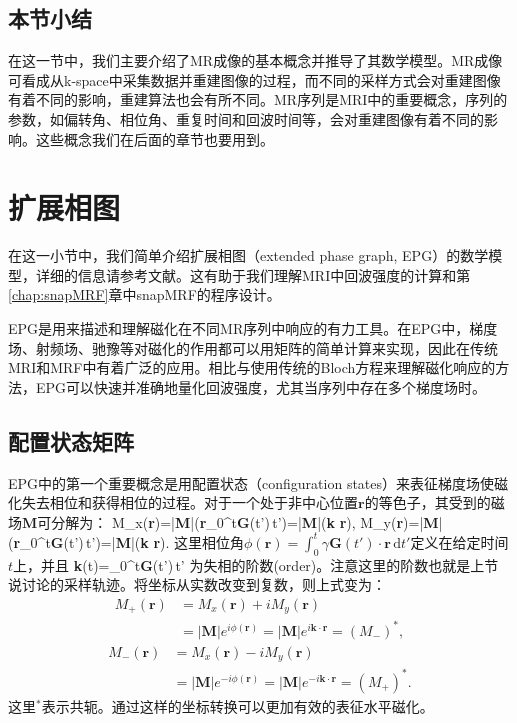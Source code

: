 \subsection{本节小结}
在这一节中，我们主要介绍了MR成像的基本概念并推导了其数学模型。MR成像可看成从k-space中采集数据并重建图像的过程，而不同的采样方式会对重建图像有着不同的影响，重建算法也会有所不同。MR序列是MRI中的重要概念，序列的参数，如偏转角、相位角、重复时间和回波时间等，会对重建图像有着不同的影响。这些概念我们在后面的章节也要用到。

\section{扩展相图}
\label{sec:epg}
在这一小节中，我们简单介绍扩展相图（extended phase graph, EPG）的数学模型，详细的信息请参考文献\cite{weigel}。这有助于我们理解MRI中回波强度的计算和第\ref{chap:snapMRF}章中snapMRF的程序设计。

EPG是用来描述和理解磁化在不同MR序列中响应的有力工具。在EPG中，梯度场、射频场、驰豫等对磁化的作用都可以用矩阵的简单计算来实现，因此在传统MRI和MRF中有着广泛的应用。相比与使用传统的Bloch方程来理解磁化响应的方法，EPG可以快速并准确地量化回波强度，尤其当序列中存在多个梯度场时。

\subsection{配置状态矩阵}
EPG中的第一个重要概念是用配置状态（configuration states）来表征梯度场使磁化失去相位和获得相位的过程。对于一个处于非中心位置$\textbf{r}$的等色子，其受到的磁场$\textbf{M}$可分解为：
 \beq M_x(\textbf{r})=|\textbf{M}|\cos\left(\gamma\textbf{r}\cdot\int_0^t\textbf{G}(t')\,t'\right)=|\textbf{M}|\cos(\textbf{k} \cdot \textbf{r}),\eeq
 \beq M_y(\textbf{r})=|\textbf{M}|\sin\left(\gamma\textbf{r}\cdot\int_0^t\textbf{G}(t')\,t'\right)=|\textbf{M}|\sin(\textbf{k} \cdot \textbf{r}).\eeq
这里相位角$\phi(\textbf{r})=\int_0^t\gamma\textbf{G}(t')\cdot\textbf{r}\,\mathrm{d}t'$定义在给定时间$t$上，并且
 \beq \textbf{k}(t)=\gamma\int_0^t\textbf{G}(t')\,t'\eeq
为失相的阶数(order)。注意这里的阶数也就是上节说讨论的采样轨迹。将坐标从实数改变到复数，则上式变为：
 \begin{align}
 M_+(\textbf{r})&=M_x(\textbf{r})+iM_y(\textbf{r})\nonumber\\ &=|\textbf{M}|e^{i\phi(\textbf{r})}=|\textbf{M}|e^{i\textbf{k} \cdot \textbf{r}}=(M_-)^*,
 \end{align}
 \begin{align} M_-(\textbf{r})&=M_x(\textbf{r})-iM_y(\textbf{r})\nonumber\\ &=|\textbf{M}|e^{-i\phi(\textbf{r})}=|\textbf{M}|e^{-i\textbf{k} \cdot \textbf{r}}=(M_+)^*.\end{align}
这里$^*$表示共轭。通过这样的坐标转换可以更加有效的表征水平磁化。

